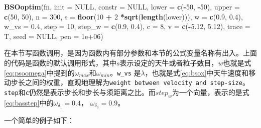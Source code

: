 \documentclass[]{ctexbook}
\newenvironment{Shaded}{\begin{snugshade}}{\end{snugshade}}
\newcommand{\KeywordTok}[1]{\textcolor[rgb]{0.13,0.29,0.53}{\textbf{#1}}}
\newcommand{\DataTypeTok}[1]{\textcolor[rgb]{0.13,0.29,0.53}{#1}}
\newcommand{\DecValTok}[1]{\textcolor[rgb]{0.00,0.00,0.81}{#1}}
\newcommand{\FloatTok}[1]{\textcolor[rgb]{0.00,0.00,0.81}{#1}}
\newcommand{\StringTok}[1]{\textcolor[rgb]{0.31,0.60,0.02}{#1}}
\newcommand{\OtherTok}[1]{\textcolor[rgb]{0.56,0.35,0.01}{#1}}
\newcommand{\OperatorTok}[1]{\textcolor[rgb]{0.81,0.36,0.00}{\textbf{#1}}}
\newcommand{\NormalTok}[1]{#1}
\begin{document}
\begin{Shaded}
\begin{Highlighting}[]
\KeywordTok{BSOoptim}\NormalTok{(fn, }\DataTypeTok{init =} \OtherTok{NULL}\NormalTok{, }\DataTypeTok{constr =} \OtherTok{NULL}\NormalTok{, }
         \DataTypeTok{lower =} \KeywordTok{c}\NormalTok{(}\OperatorTok{-}\DecValTok{50}\NormalTok{, }\OperatorTok{-}\DecValTok{50}\NormalTok{), }\DataTypeTok{upper =} \KeywordTok{c}\NormalTok{(}\DecValTok{50}\NormalTok{, }\DecValTok{50}\NormalTok{), }\DataTypeTok{n =} \DecValTok{300}\NormalTok{, }
         \DataTypeTok{s =} \KeywordTok{floor}\NormalTok{(}\DecValTok{10} \OperatorTok{+}\StringTok{ }\DecValTok{2} \OperatorTok{*}\KeywordTok{sqrt}\NormalTok{(}\KeywordTok{length}\NormalTok{(lower))), }
         \DataTypeTok{w =} \KeywordTok{c}\NormalTok{(}\FloatTok{0.9}\NormalTok{, }\FloatTok{0.4}\NormalTok{), }
         \DataTypeTok{w_vs =} \FloatTok{0.4}\NormalTok{, }
         \DataTypeTok{step =} \DecValTok{10}\NormalTok{,}
         \DataTypeTok{step_w =} \KeywordTok{c}\NormalTok{(}\FloatTok{0.9}\NormalTok{, }\FloatTok{0.4}\NormalTok{), }
         \DataTypeTok{c =} \DecValTok{8}\NormalTok{, }
         \DataTypeTok{v =} \KeywordTok{c}\NormalTok{(}\OperatorTok{-}\FloatTok{5.12}\NormalTok{, }\FloatTok{5.12}\NormalTok{), }
         \DataTypeTok{trace =}\NormalTok{ T,}
         \DataTypeTok{seed =} \OtherTok{NULL}\NormalTok{, }
         \DataTypeTok{pen =} \FloatTok{1e+06}\NormalTok{)}
\end{Highlighting}
\end{Shaded}

在本节写函数调用，是因为函数内有部分参数和本节的公式变量名称有出入。上面的代码是函数的默认调用形式，其中\(s\)表示设定的天牛或者粒子数目，\(w\)也就是式\eqref{eq:psoomega}中提到的\(\omega_{max}\)和\(\omega_{min}\)。\texttt{w\_vs}
是\(\lambda\)，也就是式\eqref{eq:bsox}中天牛速度和移动步长之间的权重，直观地理解为\texttt{weight\ between\ velocity\ and\ step-size}。\texttt{step}和\texttt{c}仍然是表示步长和步长与须距离之比。而\(step_w\)为一个向量，表示的是式\eqref{eq:basstep}中的\(\omega_{\delta_1} = 0.4\)，
\(\omega_{\delta_0} = 0.9\)。

一个简单的例子如下：
\end{document}
